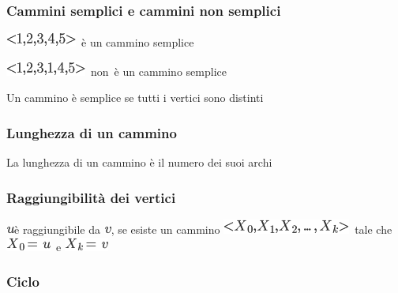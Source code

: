 \documentclass{article}
\begin{document}
\hypertarget{h.sjz08mn040is}{\subsubsection{\texorpdfstring{{Cammini
semplici e cammini non
semplici}}{Cammini semplici e cammini non semplici}}\label{h.sjz08mn040is}}

\includegraphics{images/image349.png}{~è un cammino semplice}

\includegraphics{images/image350.png}{~}{non}{~}{è un cammino semplice}

{Un cammino è semplice se tutti i vertici sono distinti}

\hypertarget{h.e18ltelmo48z}{\subsubsection{\texorpdfstring{{Lunghezza
di un cammino}}{Lunghezza di un cammino}}\label{h.e18ltelmo48z}}

{La lunghezza di un cammino è il numero dei suoi archi}

\hypertarget{h.4bm9pdnjdb2q}{\subsubsection{\texorpdfstring{{Raggiungibilità
dei vertici}}{Raggiungibilità dei vertici}}\label{h.4bm9pdnjdb2q}}

\includegraphics{images/image103.png}{è raggiungibile da
}\includegraphics{images/image76.png}{, se esiste un cammino
}\includegraphics{images/image347.png}{~tale che
}\includegraphics{images/image351.png}{~e
}\includegraphics{images/image352.png}

\hypertarget{h.4fm287mz4am5}{\subsubsection{\texorpdfstring{{Ciclo}}{Ciclo}}\label{h.4fm287mz4am5}}
\end{document}
